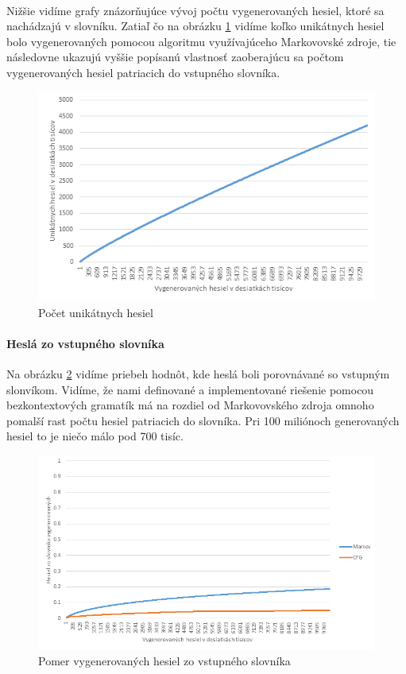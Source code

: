 \paragraph{}
Nižšie vidíme grafy znázorňujúce vývoj počtu vygenerovaných hesiel, ktoré sa nachádzajú v slovníku. Zatiaľ čo na obrázku \ref{fig:uniqMarkov} vidíme koľko unikátnych hesiel bolo vygenerovaných pomocou algoritmu využívajúceho Markovovské zdroje, tie následovne ukazujú vyššie popísanú vlastnosť zaoberajúcu sa počtom vygenerovaných hesiel patriacich do vstupného slovníka.

\begin{figure}[ht]
    \centering
    \includegraphics[width=1\textwidth]{uniqMarkov}
    \caption{Počet unikátnych hesiel}
    \label{fig:uniqMarkov}
\end{figure}
\paragraph{Heslá zo vstupného slovníka}
Na obrázku \ref{fig:sameDictAcc} vidíme priebeh hodnôt, kde heslá boli porovnávané so vstupným slonvíkom. Vidíme, že nami definované a implementované riešenie pomocou bezkontextových gramatík má na rozdiel od Markovovského zdroja omnoho pomalší rast počtu hesiel patriacich do slovníka. Pri 100 miliónoch generovaných hesiel to je niečo málo pod 700 tisíc.

\begin{figure}[ht]
    \centering
    \includegraphics[width=1\textwidth]{sameDictAcc}
    \caption{Pomer vygenerovaných hesiel zo vstupného slovníka}
    \label{fig:sameDictAcc}
\end{figure}

